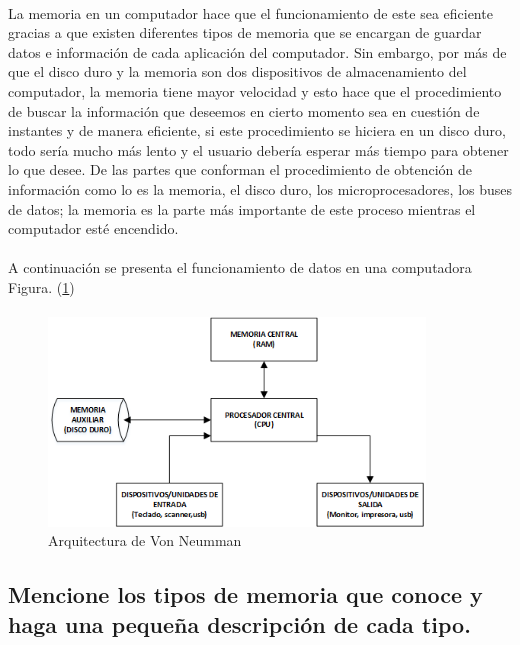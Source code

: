\documentclass{article}
\begin{document}
\paragraph{}
La memoria en un computador hace que el funcionamiento de este sea eficiente gracias a que existen diferentes tipos de memoria que se encargan de guardar datos e información de cada aplicación del computador. Sin embargo, por más de que el disco duro y la memoria son dos dispositivos de almacenamiento del computador, la memoria tiene mayor velocidad y esto hace que el procedimiento de buscar la información que deseemos en cierto momento sea en cuestión de instantes y de manera eficiente, si este procedimiento se hiciera en un disco duro, todo sería mucho más lento y el usuario debería esperar más tiempo para obtener lo que desee. De las partes que conforman el procedimiento de obtención de información como lo es la memoria, el disco duro, los microprocesadores, los buses de datos; la memoria es la parte más importante de este proceso mientras el computador esté encendido.

\paragraph{}
A continuación se presenta el funcionamiento de datos en una computadora Figura. (\ref{fig:imagen1})
\paragraph{}

\begin{figure}[h]
\includegraphics[width=10cm]{imagen1.png}
\centering
\caption{Arquitectura de Von Neumman \cite{img1}}
\label{fig:imagen1}
\end{figure}
\subsection{Mencione los tipos de memoria que conoce y haga una pequeña descripción de cada tipo.}
\end{document}
